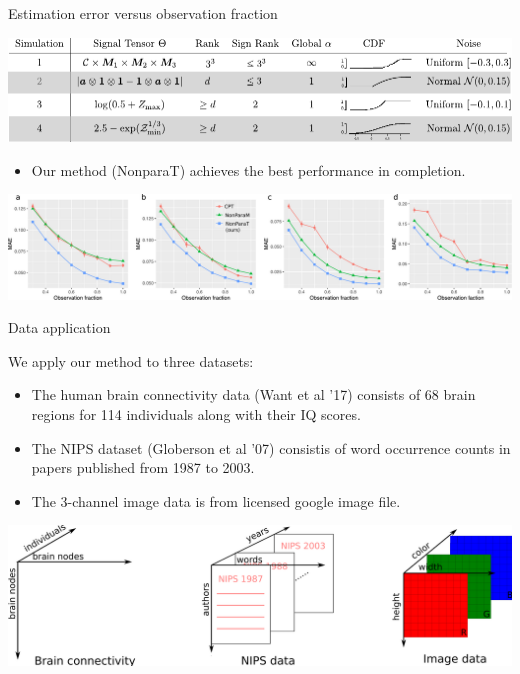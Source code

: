 \documentclass[10pt, mathserif]{beamer} %
\theoremstyle{definition}
\theoremstyle{plain}
\begin{document}
\begin{frame}{Estimation error versus observation fraction}

    \begin{center}
        \includegraphics[width = \textwidth]{Figures/simulation_new.pdf}
        \end{center}
        
  \begin{itemize}
    \item Our method (NonparaT) achieves the best performance in completion. 
  \end{itemize}
    
    \begin{center}
  \includegraphics[width =\textwidth]{Figures/fig5-8v2.pdf}
  \end{center}
    
\end{frame}


\begin{frame}{Data application}

We apply our method to three datasets:
\begin{itemize}
\item The human brain connectivity data (Want et al '17) consists of 68 brain regions for 114 individuals along with their IQ scores.

\item The NIPS dataset (Globerson et al '07) consistis of word occurrence counts in papers published from 1987 to 2003.
\item The 3-channel image data is from licensed google image file.


\end{itemize}
    \begin{center}
    \includegraphics[width =\textwidth]{Figures/ndataset.pdf}
    \end{center}
\end{frame}
\end{document}
